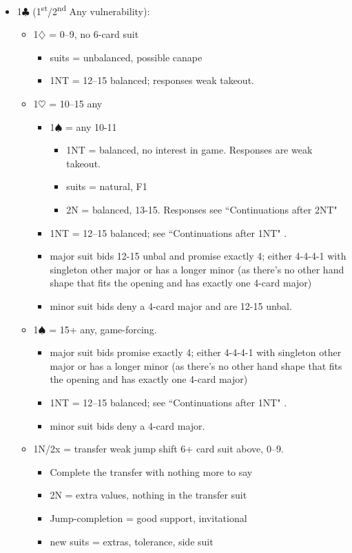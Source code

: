 \documentclass[a4paper,14pt]{extarticle}
\begin{document}
\begin{itemize}
\item 1$\clubsuit$ (1\textsuperscript{st}/2\textsuperscript{nd} Any vulnerability):
	\begin{itemize}
   \item 1$\diamondsuit$ = 0--9, no 6-card suit
		\begin{itemize}
      \item suits = unbalanced, possible canape
      \item 1NT = 12--15 balanced; responses weak takeout.
		\end{itemize}
   \item 1$\heartsuit$ = 10--15 any
		\begin{itemize}
      \item 1$\spadesuit$ = any 10-11
			\begin{itemize}
			\item 1NT = balanced, no interest in game. Responses are weak takeout.
			\item suits = natural, F1
			\item 2N = balanced, 13-15. Responses see ``Continuations after 2NT" 
			\end{itemize}
      \item 1NT = 12--15 balanced; see ``Continuations after 1NT" .
      \item major suit bids 12-15 unbal and promise exactly 4; either 4-4-4-1
            with singleton other major or has a longer minor (as there's no other
            hand shape that fits the opening and has exactly one 4-card major)
      \item minor suit bids deny a 4-card major and are 12-15 unbal.
		\end{itemize}
   \item 1$\spadesuit$ = 15+ any, game-forcing.
		\begin{itemize}
      \item major suit bids promise exactly 4; either 4-4-4-1 with singleton other
         major or has a longer minor (as there's no other hand shape that fits the
         opening and has exactly one 4-card major)
      \item 1NT = 12--15 balanced; see ``Continuations after 1NT" .
      \item minor suit bids deny a 4-card major.
		\end{itemize}
   \item 1N/2x = transfer weak jump shift 6+ card suit above, 0--9.
		\begin{itemize}
		\item Complete the transfer with nothing more to say
		\item 2N = extra values, nothing in the transfer suit
		\item Jump-completion = good support, invitational
		\item new suits = extras, tolerance, side suit
		\end{itemize}
	\end{itemize}


\end{itemize}
\end{document}
